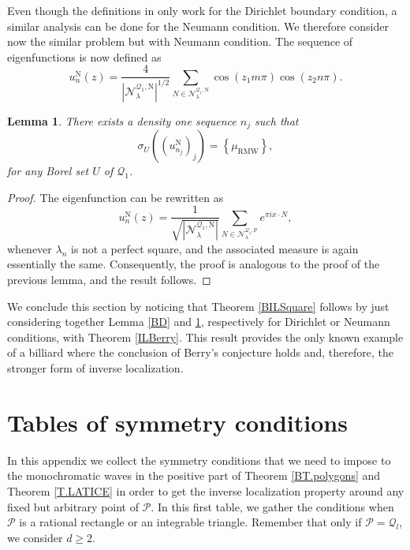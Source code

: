 \documentclass{amsart}
\newtheorem{lemma}[theorem]{Lemma}
\theoremstyle{definition}
\theoremstyle{remark}
\renewcommand\geq\geqslant
\numberwithin{equation}{section}
\theoremstyle{definition}
\theoremstyle{remark}
\newcommand\muRMW{\mu_{\mathrm{RMW}}}
\begin{document}
	Even though the definitions in \cite{Ingremeau} only work for the Dirichlet boundary condition, a similar analysis can be done for the Neumann condition. We therefore consider now the similar problem but with Neumann condition. The sequence of eigenfunctions is now defined as \begin{equation}
	u_{n}^\mathrm{N}(z)=\frac{4}{\left|\mathcal{N}_\lambda^{\mathcal{Q}_1,\mathrm{N}}\right|^{1/2}}\sum_{N\in\mathcal{N}_\lambda^{\mathcal{Q}_1,\mathrm{N}}}\cos\left(z_1m\pi\right)\cos\left(z_2n\pi\right).
\end{equation}
\begin{lemma}\label{BN}
	There exists a density one sequence $n_j$ such that \begin{equation}
		\sigma_{U}\left((u^\mathrm{N}_{n_j})_j\right)=\left\{\muRMW\right\},
	\end{equation}for any Borel set $U$ of $\mathcal{Q}_1$.\end{lemma}
	\begin{proof}
		The eigenfunction can be rewritten as
		\begin{equation}
		u_{n}^\mathrm{N}(z)=\frac{1}{\sqrt{\left|\mathcal{N}_\lambda^{\mathcal{Q}_1,\mathrm{N}}\right|}}\sum_{N\in\mathcal{N}_\lambda^{\mathcal{Q}_1,\mathrm{P}}}e^{\pi i x\cdot N},
		\end{equation}
		whenever $\lambda_n$ is not a perfect square, and the associated measure is again essentially the same. Consequently, the proof is analogous to the proof of the previous lemma, and the result follows.
	\end{proof}

We conclude this section by noticing that Theorem \ref{BILSquare} follows by just considering together Lemma \ref{BD} and \ref{BN}, respectively for Dirichlet or Neumann conditions, with Theorem \ref{ILBerry}. This result provides the only known example of a billiard where the conclusion of Berry's conjecture holds and, therefore, the stronger form of inverse localization.


\section{Tables of symmetry conditions}\label{AppendixC}
 In this appendix we collect the symmetry conditions that we need to impose to the monochromatic waves in the positive part of Theorem \ref{BT.polygons} and Theorem \ref{T.LATICE} in order to get the inverse localization property around any fixed but arbitrary point of $\mathcal{P}$. In this first table, we gather the conditions when $\mathcal{P}$ is a rational rectangle or an integrable triangle. Remember that only if $\mathcal{P}=\mathcal{Q}_l$, we consider $d\geq 2$.
\end{document}
